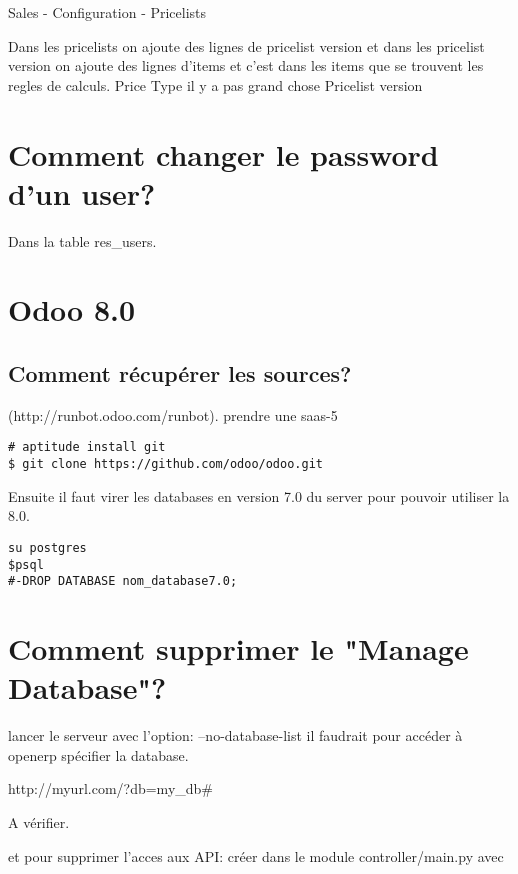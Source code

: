\documentclass[12pt,a4paper]{article}
\begin{document}
Sales - Configuration - Pricelists

Dans les pricelists on ajoute des lignes de pricelist version  et dans les pricelist version on ajoute des lignes d'items et c'est dans les items que se trouvent les regles de calculs.
Price Type il y a pas grand chose
Pricelist version

\section{Comment changer le password d'un user?}
\label{sec:change_password}

Dans la table res\_users.

\section{Odoo 8.0}
\label{sec:8.0}

\subsection{Comment récupérer les sources?}
\label{sec:get_src}

(http://runbot.odoo.com/runbot). prendre une saas-5

\begin{verbatim}
# aptitude install git
$ git clone https://github.com/odoo/odoo.git
\end{verbatim}


Ensuite il faut virer les databases en version 7.0 du server pour pouvoir utiliser la 8.0.

\begin{verbatim}
su postgres
$psql
#-DROP DATABASE nom_database7.0;
\end{verbatim}

\section{Comment supprimer le "Manage Database"?}
\label{sec:del_manage_database}

lancer le serveur avec l'option: --no-database-list
il faudrait pour accéder à openerp spécifier la database.

http://myurl.com/?db=my\_db\#

A vérifier.

et pour supprimer l'acces aux API: créer dans le module controller/main.py avec 
\end{document}
